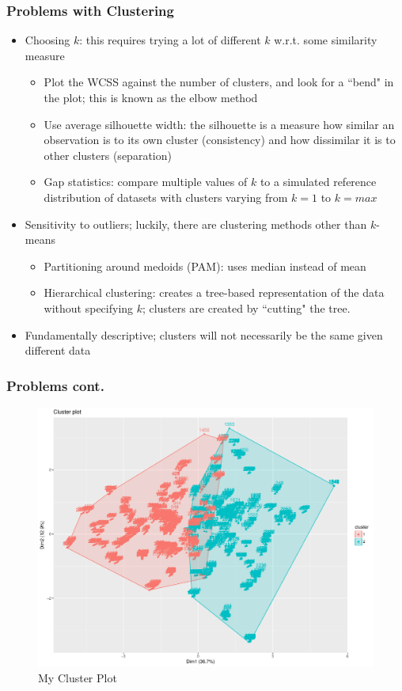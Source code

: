 \documentclass{beamer}
\begin{document}
\begin{frame}
	\frametitle{Problems with Clustering}
	\begin{itemize}
		\item Choosing $k$: this requires trying a lot of different $k$ w.r.t. some similarity measure
			\begin{itemize}
				\item Plot the WCSS against the number of clusters, and look for a ``bend" in the plot; this is known as the elbow method
				\item Use average silhouette width: the silhouette is a measure how similar an observation is to its own cluster (consistency) and how dissimilar it is to other clusters (separation)
				\item Gap statistics: compare multiple values of $k$ to a simulated reference distribution of datasets with clusters varying from $k=1$ to $k=max$
			\end{itemize}
		\item Sensitivity to outliers; luckily, there are clustering methods other than $k$-means
			\begin{itemize}
				\item Partitioning around medoids (PAM): uses median instead of mean
				\item Hierarchical clustering: creates a tree-based representation of the data without specifying $k$; clusters are created by ``cutting" the tree.  
			\end{itemize}
		\item Fundamentally descriptive; clusters will not necessarily be the same given different data
	\end{itemize}
\end{frame}

\begin{frame}
\frametitle{Problems cont.}

\begin{figure}
	\centering
	\includegraphics[width=0.7\linewidth]{clusterplot}
	\caption{My Cluster Plot}
	\label{fig:clusterplot}
\end{figure}

\end{frame}
\end{document}
